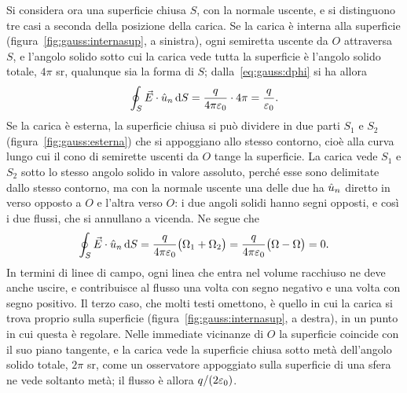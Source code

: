 \documentclass[11pt,a4paper]{article}
\begin{document}
Si considera ora una superficie chiusa $S$, con la normale uscente, e si distinguono tre casi a seconda della posizione della carica. Se la carica è interna alla superficie (figura~\ref{fig:gauss:internasup}, a sinistra), ogni semiretta uscente da $O$ attraversa $S$, e l'angolo solido sotto cui la carica vede tutta la superficie è l'angolo solido totale, $4\pi$ sr, qualunque sia la forma di $S$; dalla~\eqref{eq:gauss:dphi} si ha allora
\[
\oint_S\vec{E}\cdot\hat{u}_n\,\mathrm{d} S=\frac{q}{4\pi\varepsilon_0}\cdot4\pi=\frac{q}{\varepsilon_0}.
\]
Se la carica è esterna, la superficie chiusa si può dividere in due parti $S_1$ e $S_2$ (figura~\ref{fig:gauss:esterna}) che si appoggiano allo stesso contorno, cioè alla curva lungo cui il cono di semirette uscenti da $O$ tange la superficie. La carica vede $S_1$ e $S_2$ sotto lo stesso angolo solido in valore assoluto, perché esse sono delimitate dallo stesso contorno, ma con la normale uscente una delle due ha $\hat{u}_n$ diretto in verso opposto a $O$ e l'altra verso $O$: i due angoli solidi hanno segni opposti, e così i due flussi, che si annullano a vicenda. Ne segue che
\[
\oint_S\vec{E}\cdot\hat{u}_n\,\mathrm{d} S=\frac{q}{4\pi\varepsilon_0}\bigl(\Omega_1+\Omega_2\bigr)=\frac{q}{4\pi\varepsilon_0}\bigl(\Omega-\Omega\bigr)=0 .
\]
In termini di linee di campo, ogni linea che entra nel volume racchiuso ne deve anche uscire, e contribuisce al flusso una volta con segno negativo e una volta con segno positivo. Il terzo caso, che molti testi omettono, è quello in cui la carica si trova proprio sulla superficie (figura~\ref{fig:gauss:internasup}, a destra), in un punto in cui questa è regolare. Nelle immediate vicinanze di $O$ la superficie coincide con il suo piano tangente, e la carica vede la superficie chiusa sotto metà dell'angolo solido totale, $2\pi$ sr, come un osservatore appoggiato sulla superficie di una sfera ne vede soltanto metà; il flusso è allora $q/(2\varepsilon_0)$.
\end{document}
